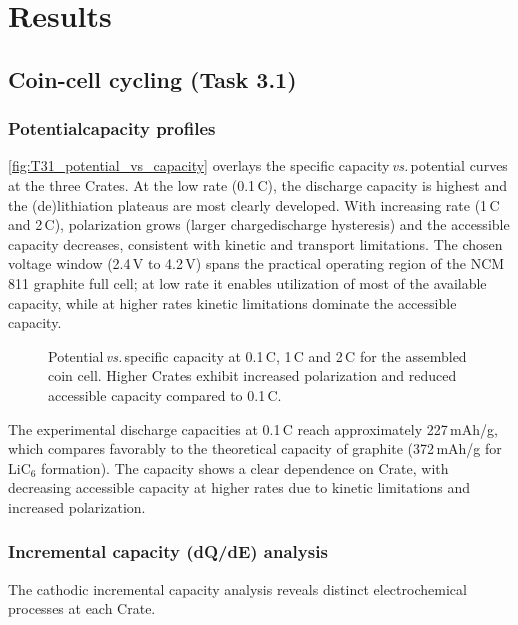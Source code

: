 \chapter{Results}

\section{Coin-cell cycling (Task 3.1)}

\subsection{Potential\textendash capacity profiles}
\autoref{fig:T31_potential_vs_capacity} overlays the specific capacity\,\textit{vs.}\,potential curves at the three C\textendash rates. At the low rate (0.1\,C), the discharge capacity is highest and the (de)lithiation plateaus are most clearly developed. With increasing rate (1\,C and 2\,C), polarization grows (larger charge\textendash discharge hysteresis) and the accessible capacity decreases, consistent with kinetic and transport limitations. The chosen voltage window (2.4\,V to 4.2\,V) spans the practical operating region of the NCM\,811\,\textbar\,graphite full cell; at low rate it enables utilization of most of the available capacity, while at higher rates kinetic limitations dominate the accessible capacity.

\begin{figure}[h]
    \centering
    
    \caption{Potential\,\textit{vs.}\,specific capacity at 0.1\,C, 1\,C and 2\,C for the assembled coin cell. Higher C\textendash rates exhibit increased polarization and reduced accessible capacity compared to 0.1\,C.}
    \label{fig:T31_potential_vs_capacity}
    \end{figure}

The experimental discharge capacities at 0.1\,C reach approximately 227\,mAh/g, which compares favorably to the theoretical capacity of graphite (372\,mAh/g for LiC$_6$ formation). The capacity shows a clear dependence on C\textendash rate, with decreasing accessible capacity at higher rates due to kinetic limitations and increased polarization.

\subsection{Incremental capacity (dQ/dE) analysis}
The cathodic incremental capacity analysis reveals distinct electrochemical processes at each C\textendash rate.

